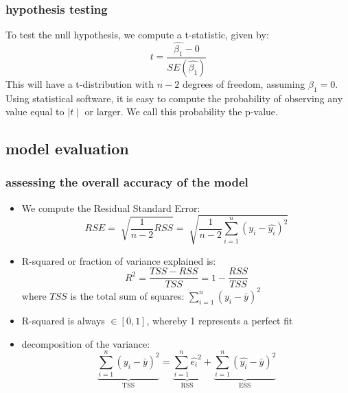 \documentclass{beamer}
\begin{document}
\begin{frame}
\frametitle{hypothesis testing}
To test the null hypothesis, we compute a t-statistic, given
by:
\begin{equation*}
t = \frac{ \hat{\beta_1} - 0 }{SE(\hat{\beta_1})}
\end{equation*}
This will have a t-distribution with $n-2$ degrees of
freedom, assuming $\beta_1 = 0$.
\newline
Using statistical software, it is easy to compute the
probability of observing any value equal to $\mid t \mid$ or larger. We
call this probability the p-value.
\end{frame}


\subsection{model evaluation}
\begin{frame}
\frametitle{assessing the overall accuracy of the model}

\begin{itemize}
\item We compute the Residual Standard Error:
\begin{equation*}
RSE = \sqrt[]{\frac{1}{n-2} RSS} = \sqrt[]{\frac{1}{n-2} \sum_{i=1}^n (y_i -\hat{y_i})^2}
\end{equation*}
\item R-squared or fraction of variance explained is:
\begin{equation*}
R^2  = \frac{TSS - RSS}{TSS} = 1- \frac{RSS}{TSS}
\end{equation*}
where $TSS$ is the total sum of squares: $\sum_{i=1}^n (y_i -\bar{y})^2$
\item R-squared is always $\in [0,1]$, whereby 1 represents a perfect fit 

\item decomposition of the variance: 
\begin{equation*}
\underbrace{\sum_{i = 1}^n (y_i-\bar{y})^2}_\text{TSS} = \underbrace{\sum_{i = 1}^n \hat{e_i}^2}_\text{RSS} + \underbrace{\sum_{i = 1}^n (\hat{y_i}-\bar{y})^2}_\text{ESS} 
\end{equation*}
\end{itemize}

\end{frame}
\end{document}
